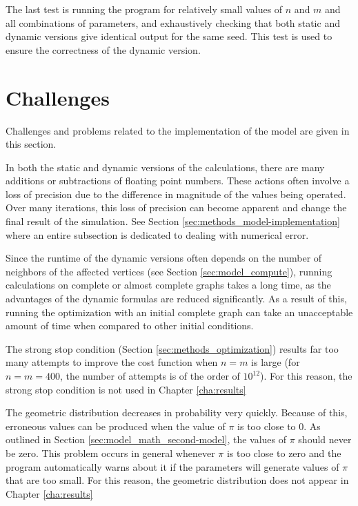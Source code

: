The last test is running the program for relatively small values of $n$ and $m$ and all combinations of parameters, and exhaustively checking that both static and dynamic versions give identical output for the same seed.
This test is used to ensure the correctness of the dynamic version.

\section{Challenges}
\label{sec:methods_challenges}

Challenges and problems related to the implementation of the model are given in this section.

In both the static and dynamic versions of the calculations, there are many additions or subtractions of floating point numbers.
These actions often involve a loss of precision due to the difference in magnitude of the values being operated.
Over many iterations, this loss of precision can become apparent and change the final result of the simulation.
See Section \ref{sec:methods_model-implementation} where an entire subsection is dedicated to dealing with numerical error.

Since the runtime of the dynamic versions often depends on the number of neighbors of the affected vertices (see Section \ref{sec:model_compute}), running calculations on complete or almost complete graphs takes a long time, as the advantages of the dynamic formulas are reduced significantly.
As a result of this, running the optimization with an initial complete graph can take an unacceptable amount of time when compared to other initial conditions.

The strong stop condition (Section \ref{sec:methods_optimization}) results far too many attempts to improve the cost function when $n=m$ is large (for $n=m=400$, the number of attempts is of the order of $10^{12}$).
For this reason, the strong stop condition is not used in Chapter \ref{cha:results}

The geometric distribution decreases in probability very quickly.
Because of this, erroneous values can be produced when the value of $\pi$ is too close to 0.
As outlined in Section \ref{sec:model_math_second-model}, the values of $\pi$ should never be zero.
This problem occurs in general whenever $\pi$ is too close to zero and the program automatically warns about it if the parameters will generate values of $\pi$ that are too small.
For this reason, the geometric distribution does not appear in Chapter \ref{cha:results}

